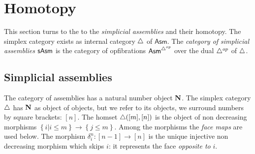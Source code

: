 \documentclass{amsart}
\theoremstyle{plain}
\newtheorem{lemma}[theorem]{Lemma}
\theoremstyle{definition}
\newtheorem{remark}[theorem]{Remark}
\newcommand\hide[1]{}
\newcommand\cat\mathcal
\newcommand\set[1]{\left\{#1\right\}}
\newcommand\Asm{\mathsf{Asm}}
\begin{document}
\hide{
\subsection{Modest factorizations}
While it is not possible to factorize general morphisms in $\Asm^{\cat B}$, it is possible to factorize modest ones.

\begin{lemma}[Modest factorization] The forgetful functor $F:\rat\pers^S\to \rat\pers$ has a left adjoint. \end{lemma}

Here $\rat\pers$ and $\rat\pers^S$ stand for the internal category of simplicial PERs and the internal category of $S$-algebras.

\begin{proof} The forgetful functor $F$ creates limits and $G(X) = \lim_{X\to F(Y)} Y$. \end{proof}

\begin{remark} The factorization does not necessarily yield an $a$-anodyne morphism though it yields a morphism which has the global left lifting property with respect to all modest fibrations. 
\end{remark}%
}

\section{Homotopy}
This section turns to the to the \emph{simplicial assemblies} and their homotopy. The simplex category exists as internal category ${\mathord{\triangle}}$ of $\Asm$. The \emph{category of simplicial assemblies} $\mathsf{sAsm}$ is the category of opfibrations $\Asm^{\simcat\dual}$ over the dual ${\mathord{\triangle}}^{op}$ of ${\mathord{\triangle}}$. %

\subsection{Simplicial assemblies}
The category of assemblies has a natural number object $\mathbf N$. The simplex category ${\mathord{\triangle}}$ has $\mathbf N$ as object of objects, but we refer to its objects, we surround numbers by square brackets: $[n]$. The homset ${\mathord{\triangle}}([m],[n])$ is the object of non decreasing morphisms $\set{i|i\leq m}\to\set{j\leq m}$. Among the morphisms the \emph{face maps} are used below. The morphism $\delta^n_i:[n-1]\to [n]$ is the unique injective non decreasing morphism which skips $i$: it represents the face \emph{opposite to} $i$.
\end{document}
